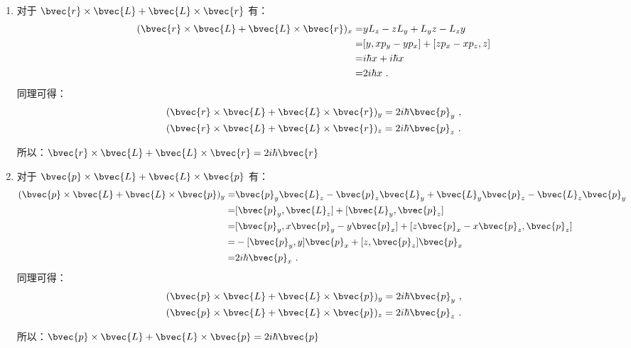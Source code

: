 \subsection{ }
\begin{enumerate}
\item 对于 $\bvec{r} \times \bvec{L} + \bvec{L} \times \bvec{r} $ 有：
\begin{equation}
\begin{aligned}
(\bvec{r} \times \bvec{L} + \bvec{L} \times \bvec{r})_{x} =& yL_{z}-zL_{y}+L_{y}z-L_{z}y \\
=& [y,xp_{y}-yp_{x}]+[zp_{x}-xp_{z},z] \\
=& i\hbar x + i\hbar x \\
=&2i\hbar x~.
\end{aligned}
\end{equation}
同理可得：\\
\begin{equation}
\begin{aligned}
& (\bvec{r} \times \bvec{L} + \bvec{L} \times \bvec{r})_{y} =2i\hbar \bvec{p}_{y}~, \\
& (\bvec{r} \times \bvec{L} + \bvec{L} \times \bvec{r})_{z} =2i\hbar \bvec{p}_{z}~.
\end{aligned}
\end{equation}

所以：$\bvec{r} \times \bvec{L} + \bvec{L} \times \bvec{r} = 2i\hbar \bvec{r} $
\item 对于 $\bvec{p} \times \bvec{L} + \bvec{L} \times \bvec{p}$ 有：
\begin{equation}
\begin{aligned}
(\bvec{p} \times \bvec{L} + \bvec{L} \times \bvec{p})_{y} =& \bvec{p}_{y} \bvec{L}_{z} - \bvec{p}_{z} \bvec{L}_{y} + \bvec{L}_{y} \bvec{p}_{z} - \bvec{L}_{z} \bvec{p}_{y} \\
=& [\bvec{p}_{y},\bvec{L}_{z}] + [\bvec{L}_{y},\bvec{p}_{z}] \\
=& [\bvec{p}_{y},x\bvec{p}_{y} - y\bvec{p}_{x}] + [z\bvec{p}_{x}-x\bvec{p}_{z},\bvec{p}_{z}] \\
=& -[\bvec{p}_{y},y]\bvec{p}_{x} + [z,\bvec{p}_{z}]\bvec{p}_{x} \\
=& 2i\hbar \bvec{p}_{x}~.
\end{aligned}
\end{equation}
同理可得：\\
\begin{equation}
\begin{aligned}
& (\bvec{p} \times \bvec{L} + \bvec{L} \times \bvec{p})_{y} =2i\hbar \bvec{p}_{y} ~,\\
& (\bvec{p} \times \bvec{L} + \bvec{L} \times \bvec{p})_{z} =2i\hbar \bvec{p}_{z}~.
\end{aligned}
\end{equation}

所以：$\bvec{p} \times \bvec{L} + \bvec{L} \times \bvec{p} = 2i\hbar \bvec{p} $
\end{enumerate}

